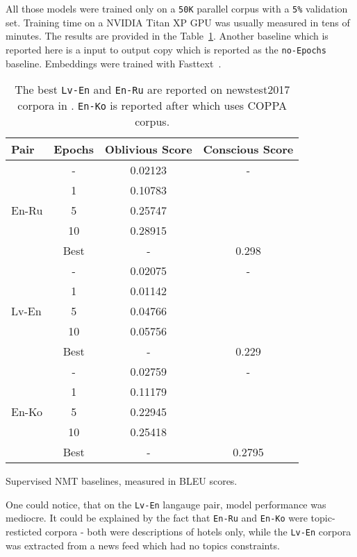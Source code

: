 \documentclass[]{article}
\begin{document}
All those models were trained only on a {\tt 50K} parallel corpus with a {\tt 5\%} validation set.
Training time on a NVIDIA Titan XP GPU was usually measured in tens of minutes.
The results are provided in the Table~\ref{table:baselines}.
Another baseline which is reported here is a input to output copy which is reported as the {\tt no-Epochs} baseline.
Embeddings were trained with Fasttext~\citep{bojanowski2016enriching}.

\begin{table}
\begin{center}
\begin{tabular}{ l c c c }
Pair & Epochs & Oblivious Score & Conscious Score \\
\hline
\multirow{5}{4em}{En-Ru} & - & 0.02123 & - \\
& 1 & 0.10783 & \\
& 5 & 0.25747 & \\
& 10 & 0.28915 & \\
& Best & -  & 0.298 \\
\hline
\multirow{5}{4em}{Lv-En} & - & 0.02075 & - \\
& 1 & 0.01142 & \\
& 5 & 0.04766 & \\
& 10 & 0.05756 & \\
& Best & - & 0.229 \\
\hline
\multirow{5}{4em}{En-Ko} & - & 0.02759 & - \\
& 1 & 0.11179 & \\
& 5 & 0.22945 & \\
& 10 & 0.25418 & \\
& Best & - & 0.2795
\end{tabular}
\end{center}
\caption{Supervised NMT baselines, measured in BLEU scores.}
\caption*{\small
The best {\tt Lv-En} and  {\tt En-Ru} are reported on newstest2017 corpora in \cite{bojar2017findings}.
{\tt En-Ko} is reported after \cite{junczys2016coppa} which uses COPPA corpus.
}
\label{table:baselines}
\end{table}

One could notice, that on the {\tt Lv-En} langauge pair, model performance was mediocre.
It could be explained by the fact that {\tt En-Ru} and {\tt En-Ko} were topic-resticted corpora - both were descriptions of hotels only, while the {\tt Lv-En} corpora was extracted from a news feed which had no topics constraints.
\end{document}
